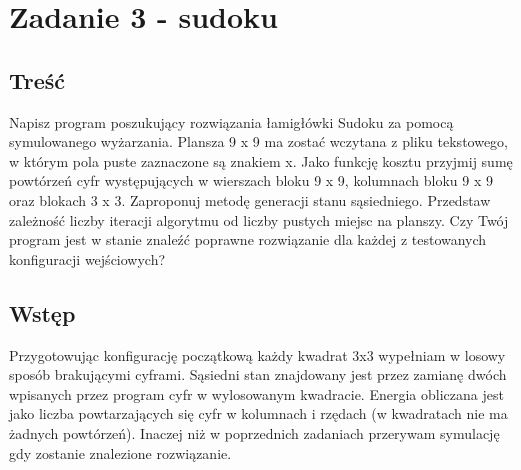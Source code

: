\section{Zadanie 3 - sudoku}
\subsection{Treść}
Napisz program poszukujący rozwiązania łamigłówki Sudoku za pomocą symulowanego
wyżarzania. Plansza 9 x 9 ma zostać wczytana z pliku tekstowego, w którym pola puste
zaznaczone są znakiem x. Jako funkcję kosztu przyjmij sumę powtórzeń cyfr występujących
w wierszach bloku 9 x 9, kolumnach bloku 9 x 9 oraz blokach 3 x 3. Zaproponuj
metodę generacji stanu sąsiedniego. Przedstaw zależność liczby iteracji algorytmu od
liczby pustych miejsc na planszy. Czy Twój program jest w stanie znaleźć poprawne
rozwiązanie dla każdej z testowanych konfiguracji wejściowych?

\subsection{Wstęp}
Przygotowując konfigurację początkową każdy kwadrat 3x3 wypełniam w losowy sposób brakującymi cyframi.
Sąsiedni stan znajdowany jest przez zamianę dwóch wpisanych przez program cyfr w wylosowanym kwadracie.
Energia obliczana jest jako liczba powtarzających się cyfr w kolumnach i rzędach (w kwadratach nie ma żadnych powtórzeń). Inaczej niż w poprzednich zadaniach przerywam symulację gdy zostanie znalezione rozwiązanie.
